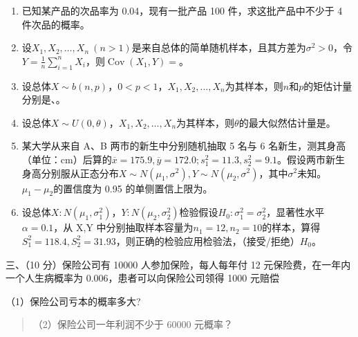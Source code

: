 \documentclass[fontset=exam]{exam-zh}
\begin{document}
\par{}\smallskip

\begin{enumerate}
\def\labelenumi{\arabic{enumi}.}
\item
  已知某产品的次品率为 0.04，现有一批产品 100 件，求这批产品中不少于 4 件次品的概率\underline{\hspace{2cm}}。
\item
  设\(X_1,X_2,\ldots,X_n\ (n>1)\)是来自总体的简单随机样本，且其方差为\(\sigma^2>0\)，令\(Y=\frac1n\sum_{i=1}^nX_i\)，则\(\operatorname{Cov}(X_1,Y)=\)\underline{\hspace{2cm}}。
\item
  设总体\(X\sim b(n,p)\)，\(0<p<1\)，\(X_1,X_2,\ldots,X_n\)为其样本，则\(n\)和\(p\)的矩估计量分别是\underline{\hspace{2cm}}、\underline{\hspace{2cm}}。
\item
  设总体\(X\sim U(0,\theta)\)，\(X_1,X_2,\ldots,X_n\)为其样本，则\(\theta\)的最大似然估计量是\underline{\hspace{2cm}}。
\item
  某大学从来自 A、B 两市的新生中分别随机抽取 5 名与 6 名新生，测其身高（单位：cm）后算的\(\overline x=175.9,\overline y=172.0;s_1^2=11.3,s_2^2=9.1\)。假设两市新生身高分别服从正态分布\(X\sim N(\mu_1,\sigma^2),Y\sim N(\mu_2,\sigma^2)\)，其中\(\sigma^2\)未知。\(\mu_1-\mu_2\)的置信度为 0.95 的单侧置信上限为\underline{\hspace{2cm}}。
\item
  设总体\(X:N(\mu_1,\sigma_1^2)\)，\(Y:N(\mu_2,\sigma_2^2)\)检验假设\(H_0:\sigma_1^2=\sigma_2^2\)，显著性水平\(\alpha=0.1\)，从 X,Y 中分别抽取样本容量为\(n_1=12,n_2=10\)的样本，算得\(S_1^2=118.4,S_2^2=31.93\)，则正确的检验应用\underline{\hspace{2cm}}检验法，\underline{\hspace{2cm}}（接受/拒绝）\(H_0\)。
\end{enumerate}


三、（10 分）保险公司有 10000 人参加保险，每人每年付 12 元保险费，在一年内一个人生病概率为 0.006，患者可以向保险公司领得 1000 元赔偿

（1）保险公司亏本的概率多大?

\begin{quote}
（2）保险公司一年利润不少于 60000 元概率？
\end{quote}
\end{document}
